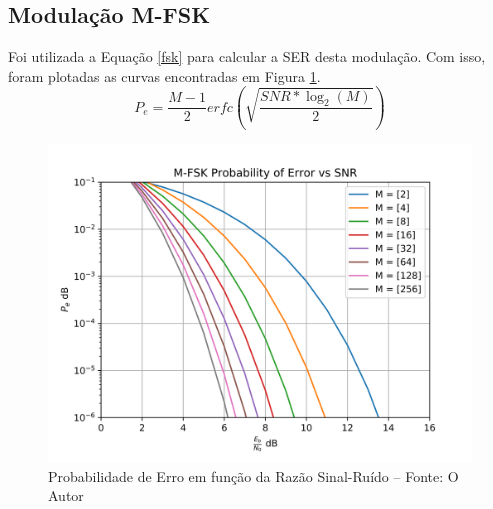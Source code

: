\documentclass[10pt,two column,a4paper]{article}
\begin{document}
	\subsection{Modulação M-FSK}
	Foi utilizada a Equação \eqref{fsk} para calcular a SER desta modulação. Com isso, foram plotadas as curvas encontradas em Figura \ref{fskI}.
	\begin{dmath}
		P_e  = \frac{M-1}{2}erfc\left(\sqrt{\frac{SNR*\log_2(M)}{2}}\right)
		\label{fsk}
	\end{dmath}
	\begin{figure}[h]\centering
		\includegraphics[width=\linewidth]{imagens_ex1/fsk.png}\caption{Probabilidade de Erro em função da Razão Sinal-Ruído -- Fonte: O Autor}\label{fskI}
	\end{figure}
\end{document}

